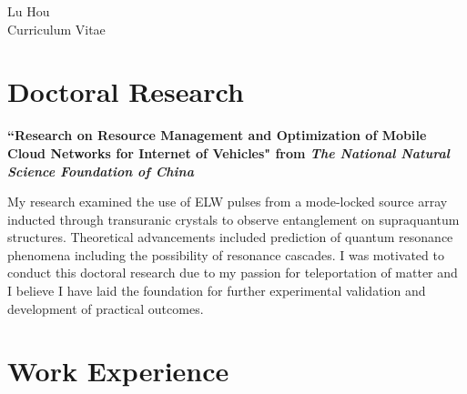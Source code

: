 \documentclass[10pt]{article} %
\begin{document}
\begin{paracol}{2} %


\parbox[top][0.12\textheight][c]{\linewidth}{ %
	\vspace{-0.04\textheight} %
	\centering %
	{\sffamily\Huge Lu Hou}\\\medskip %
	{\Huge\color{headings}\cvtextfont Curriculum Vitae}
}


\section{Doctoral Research}

{\raggedright\textbf{``Research on Resource Management and Optimization of Mobile Cloud Networks for Internet of Vehicles" from \textit{The National Natural Science Foundation of China}}\\\medskip}

My research examined the use of ELW pulses from a mode-locked source array inducted through transuranic crystals to observe entanglement on supraquantum structures. Theoretical advancements included prediction of quantum resonance phenomena including the possibility of resonance cascades. I was motivated to conduct this doctoral research due to my passion for teleportation of matter and I believe I have laid the foundation for further experimental validation and development of practical outcomes.

\medskip %


\section{Work Experience}


\end{paracol}
\end{document}
